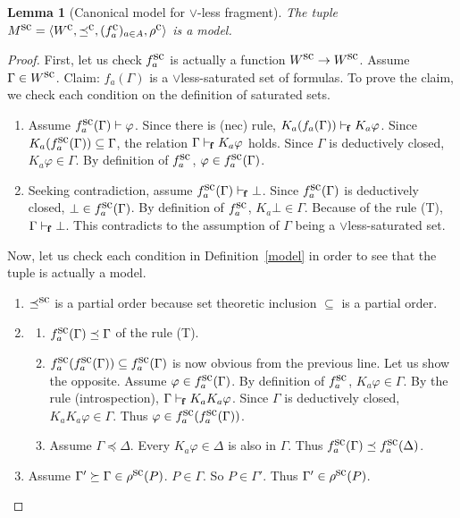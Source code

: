 \documentclass[doctor]{iscs-thesis}
\newtheorem{lemma}{Lemma}
\begin{document}
\begin{lemma}[Canonical model for $\vee$-less fragment]
The tuple $M^{\mbox{sc}} = \langle{W^{\mbox{c}}, \preceq^{\mbox{c}}, (f_a^{\mbox{c}})_{a\in A}, \rho^{\mbox{c}}}\rangle$ is a model.
\end{lemma}
\begin{proof}
First, let us check $f^{\mbox{sc}}_a$ is actually a function $W^{\mbox{sc}}\rightarrow W^{\mbox{sc}}$.
Assume $\Gamma\in W^{\mbox{sc}}$. Claim: $f_a(\Gamma)$ is a $\vee$less-saturated set of formulas. To prove
 the claim, we check each condition on the definition of saturated sets.
\begin{enumerate}
 \item 
	Assume $f^{\mbox{sc}}_a(\Gamma)\vdash \varphi$. Since there is (nec) rule, ${K_a}
	(f_a(\Gamma))\vdash_{\kern -1pt\mathbf f} {K_a}\varphi$. 
	Since ${K_a}(f^{\mbox{sc}}_a(\Gamma))\subseteq \Gamma$, the relation 
       $\Gamma\vdash_{\kern -1pt\mathbf f}{K_a}\varphi$ holds.
       Since $\Gamma$ is deductively closed, ${K_a}\varphi\in \Gamma$.
	By definition of $f^{\mbox{sc}}_a$, $\varphi \in f^{\mbox{sc}}_a(\Gamma)$.
 \item Seeking contradiction, assume $f^{\mbox{sc}}_a(\Gamma)\vdash_{\kern -1pt\mathbf f}\bot$.
       Since $f^{\mbox{sc}}_a(\Gamma)$ is deductively closed, $\bot\in f^{\mbox{sc}}_a(\Gamma)$.
       By definition of $f^{\mbox{sc}}_a$, ${K_a}\bot\in \Gamma$.
       Because of the rule (T), $\Gamma\vdash_{\kern -1pt\mathbf f}\bot$. This contradicts to the assumption of
       $\Gamma$ being a $\vee$less-saturated set.
\end{enumerate}
Now, let us check each condition in Definition~\ref{model} in order to see that the tuple
 is actually a model.
 \begin{enumerate}
  \item $\preceq^{\mbox{sc}}$ is a partial order because set theoretic inclusion $\subseteq$ is a
	partial order.
  \item 
\begin{enumerate}
 \item $f^{\mbox{sc}}_a(\Gamma)\preceq \Gamma$ of the rule (T).
  \item $f^{\mbox{sc}}_a(f^{\mbox{sc}}_a(\Gamma))\subseteq f^{\mbox{sc}}_a(\Gamma)$ is now obvious from the
	previous line. Let us show the opposite. Assume $\varphi\in f^{\mbox{sc}}_a(\Gamma)$.
	By definition of $f^{\mbox{sc}}_a$, ${K_a}\varphi\in\Gamma$. By the rule
	(introspection),
	$\Gamma\vdash_{\kern -1pt\mathbf f}{K_a}{K_a}\varphi$.
	Since $\Gamma$ is deductively closed, ${K_a}{K_a}\varphi\in\Gamma$.
	Thus $\varphi\in f^{\mbox{sc}}_a(f^{\mbox{sc}}_a(\Gamma))$.
  \item Assume $\Gamma\preceq \Delta$.
	Every ${K_a}\varphi\in\Delta$ is also in $\Gamma$.
	Thus $f^{\mbox{sc}}_a(\Gamma)\preceq f^{\mbox{sc}}_a(\Delta)$.
\end{enumerate}
  \item Assume $\Gamma'\succeq \Gamma\in\rho^{\mbox{sc}}(P)$. $P\in \Gamma$. So $P\in \Gamma'$. Thus
	$\Gamma'\in \rho^{\mbox{sc}}(P)$.
 \end{enumerate}
\end{proof}
\end{document}
